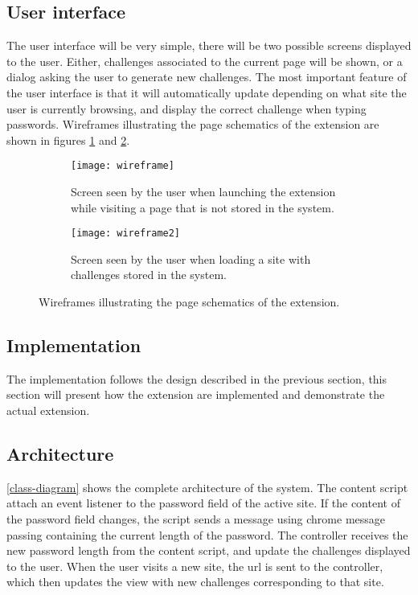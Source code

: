 \subsection{User interface}
The user interface will be very simple, there will be two possible screens displayed to the user. Either, challenges associated to the current page will be shown, or a dialog asking the user to generate new challenges. The most important feature of the user interface is that it will automatically update depending on what site the user is currently browsing, and display the correct challenge when typing passwords. Wireframes illustrating the page schematics of the extension are shown in figures \ref{add-new-screen} and \ref{challenge-screen}.

\begin{figure}[h]
    \centering
    \begin{subfigure}[t]{0.49\textwidth}
        \centering
        \texttt{[image: wireframe]} 
        \caption{Screen seen by the user when launching the extension while visiting a page that is not stored in the system.}
        \label{add-new-screen}
    \end{subfigure}
    \hfill
    \begin{subfigure}[t]{0.49\textwidth}
        \centering
        \texttt{[image: wireframe2]} 
        \caption{Screen seen by the user when loading a site with challenges stored in the system. }
        \label{challenge-screen}
    \end{subfigure}
    \caption{Wireframes illustrating the page schematics of the extension.}
    \label{wireframes}
\end{figure}

\subsection{Implementation}
The implementation follows the design described in the previous section, this section will present how the extension are implemented and demonstrate the actual extension. 


\subsection{Architecture}
\par \autoref{class-diagram} shows the complete architecture of the system.
 The content script attach an event listener to the password field of the active site. If the content of the password field changes, the script sends a message using chrome message passing containing the current length of the password. The controller receives the new password length from the content script, and update the challenges displayed to the user. When the user visits a new site, the url is sent to the controller, which then updates the view with new challenges corresponding to that site.

